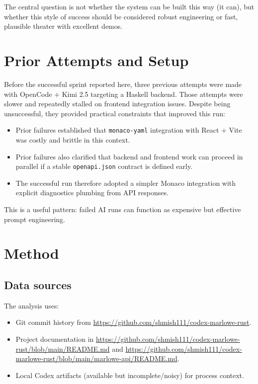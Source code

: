 \documentclass[11pt]{article}
\begin{document}
The central question is not whether the system can be built this way (it can), but whether this style of success should be considered robust engineering or fast, plausible theater with excellent demos.

\section{Prior Attempts and Setup}
Before the successful sprint reported here, three previous attempts were made with OpenCode + Kimi 2.5 targeting a Haskell backend. Those attempts were slower and repeatedly stalled on frontend integration issues. Despite being unsuccessful, they provided practical constraints that improved this run:

\begin{itemize}
  \item Prior failures established that \texttt{monaco-yaml} integration with React + Vite was costly and brittle in this context.
  \item Prior failures also clarified that backend and frontend work can proceed in parallel if a stable \texttt{openapi.json} contract is defined early.
  \item The successful run therefore adopted a simpler Monaco integration with explicit diagnostics plumbing from API responses.
\end{itemize}

This is a useful pattern: failed AI runs can function as expensive but effective prompt engineering.

\section{Method}
\subsection{Data sources}
The analysis uses:

\begin{itemize}
  \item Git commit history from \url{https://github.com/shmish111/codex-marlowe-rust}.
  \item Project documentation in \url{https://github.com/shmish111/codex-marlowe-rust/blob/main/README.md} and \url{https://github.com/shmish111/codex-marlowe-rust/blob/main/marlowe-api/README.md}.
  \item Local Codex artifacts (available but incomplete/noisy) for process context.
\end{itemize}
\end{document}
